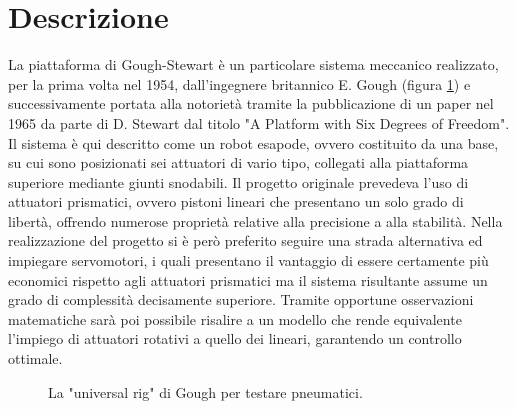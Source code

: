 \documentclass[12pt,twoside,openright]{report}
\begin{document}
\section{Descrizione}\label{piattaformastewart}
La piattaforma di Gough-Stewart è un particolare sistema meccanico realizzato, per la prima volta nel 1954, dall'ingegnere britannico E. Gough (figura \ref{fig:gough}) e successivamente portata alla notorietà tramite la pubblicazione di un paper nel 1965 da parte di D. Stewart dal titolo "A Platform with Six Degrees of Freedom"\cite{stewart1965platform}. Il sistema è qui descritto come un robot esapode, ovvero costituito da una base, su cui sono posizionati sei attuatori di vario tipo, collegati alla piattaforma superiore mediante giunti snodabili. Il progetto originale prevedeva l'uso di attuatori prismatici, ovvero pistoni lineari che presentano un solo grado di libertà, offrendo numerose proprietà relative alla precisione a alla stabilità. Nella realizzazione del progetto si è però preferito seguire una strada alternativa ed impiegare servomotori, i quali presentano il vantaggio di essere certamente più economici rispetto agli attuatori prismatici ma il sistema risultante assume un grado di complessità decisamente superiore. Tramite opportune osservazioni matematiche sarà poi possibile risalire a un modello che rende equivalente l'impiego di attuatori rotativi a quello dei lineari, garantendo un controllo ottimale.
\begin{figure}[h!]
\centering
{}
\caption{La "universal rig" di Gough per testare pneumatici\cite{gough}.} \label{fig:gough}
\end{figure}
\end{document}
